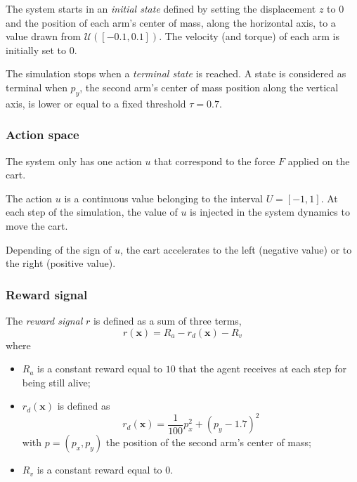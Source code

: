 \documentclass[a4paper, 12pt]{article}
\begin{document}
    The system starts in an \emph{initial state} defined by setting the displacement $z$ to $0$ and the position of each arm's center of mass, along the horizontal axis, to a value drawn from $\mathcal{U}([-0.1, 0.1])$. The velocity (and torque) of each arm is initially set to $0$.
    
    The simulation stops when a \emph{terminal state} is reached. A state is considered as terminal when $p_y$, the second arm's center of mass position along the vertical axis, is lower or equal to a fixed threshold $\tau = \num{0.7}$.
    
    \subsubsection{Action space}
    
    The system only has one action $u$ that correspond to the force $F$ applied on the cart.
    
    The action $u$ is a continuous value belonging to the interval $U = [-1, 1]$. At each step of the simulation, the value of $u$ is injected in the system dynamics to move the cart.
    
    Depending of the sign of $u$, the cart accelerates to the left (negative value) or to the right (positive value).
    
    \subsubsection{Reward signal}
    
    The \emph{reward signal} $r$ is defined as a sum of three terms,
    \begin{equation}\label{eq:reward.signal}
        r(\bm{x}) = R_a - r_d(\bm{x}) - R_v
    \end{equation}
    where
    
    \begin{itemize}
        \item $R_a$ is a constant reward equal to $\num{10}$ that the agent receives at each step for being still alive;
        \item $r_d(\bm{x})$ is defined as
        \begin{equation}
            r_d(\bm{x}) = \frac{1}{100}p_x^2 + (p_y - \num{1.7})^2
        \end{equation}
        with $p = (p_x, p_y)$ the position of the second arm's center of mass;
        \item $R_v$ is a constant reward equal to $\num{0}$.
    \end{itemize}
    
\end{document}
